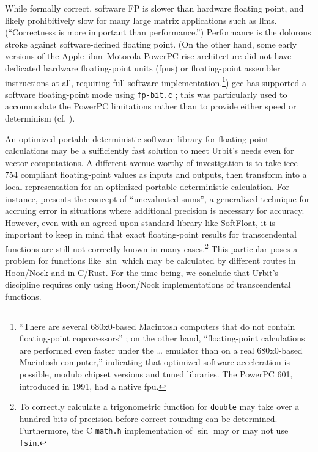 \documentclass[twoside]{article}
\begin{document}
While formally correct, software FP is slower than hardware floating point, and likely prohibitively slow for many large matrix applications such as {\sc llm}s.  (“Correctness is more important than performance.”)  Performance is the dolorous stroke against software-defined floating point.  (On the other hand, some early versions of the Apple–{\sc ibm}–Motorola PowerPC {\sc risc} architecture did not have dedicated hardware floating-point units ({\sc fpu}s) or floating-point assembler instructions at all, requiring full software implementation.\footnote{“There are several 680x0-based Macintosh computers that do not contain floating-point coprocessors” \citep{Apple1994}; on the other hand, “floating-point calculations are performed even faster under the … emulator than on a real 680x0-based Macintosh computer,” indicating that optimized software acceleration is possible, modulo chipset versions and tuned libraries.  The PowerPC 601, introduced in 1991, had a native {\sc fpu}.})  {\sc gcc} has supported a software floating-point mode using \texttt{fp-bit.c} \citep{GCCWiki}; this was particularly used to accommodate the PowerPC limitations rather than to provide either speed or determinism (cf. \citet{Sidwell2006}).

An optimized portable deterministic software library for floating-point calculations may be a sufficiently fast solution to meet Urbit's needs even for vector computations.  A different avenue worthy of investigation is to take {\sc ieee} 754 compliant floating-point values as inputs and outputs, then transform into a local representation for an optimized portable deterministic calculation.  For instance, \citet{Thall2007} presents the concept of “unevaluated sums”, a generalized technique for accruing error in situations where additional precision is necessary for accuracy.  However, even with an agreed-upon standard library like SoftFloat, it is important to keep in mind that exact floating-point results for transcendental functions are still not correctly known in many cases.\footnote{To correctly calculate a trigonometric function for \texttt{double} may take over a hundred bits of precision before correct rounding can be determined.  Furthermore, the C \texttt{math.h} implementation of $\sin$ may or may not use \texttt{fsin}.}  This particular poses a problem for functions like $\sin$ which may be calculated by different routes in Hoon/Nock and in C/Rust.  For the time being, we conclude that Urbit's discipline requires only using Hoon/Nock implementations of transcendental functions.
\end{document}
